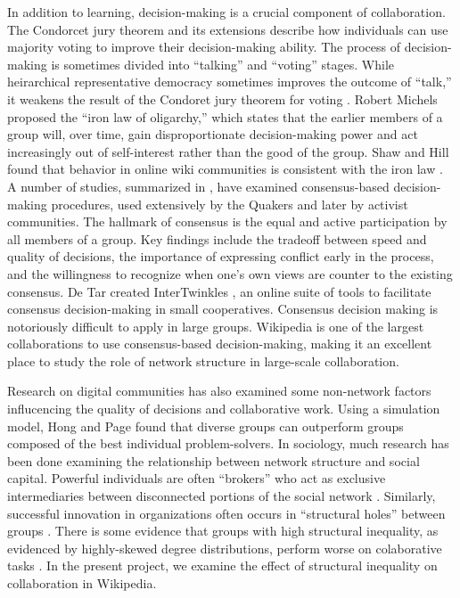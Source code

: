 \documentclass[10pt,twocolumn]{article}
\newcommand{\+}{\phantom{-}}
\begin{document}
In addition to learning, decision-making is a crucial component of collaboration.
The Condorcet jury theorem and its extensions \cite{list_epistemic_2001}
describe how individuals can use majority voting to improve their
decision-making ability.
The process of decision-making is sometimes divided into
``talking'' and ``voting'' stages.
While heirarchical representative democracy sometimes improves the outcome
of ``talk,'' it weakens the result of the Condoret jury theorem for voting
\cite{list_epistemic_2001}.
Robert Michels proposed the ``iron law of oligarchy,''
\cite{michels_political_1999} which states that
the earlier members of a group will, over time, gain disproportionate
decision-making power and act increasingly out of self-interest rather than
the good of the group.
Shaw and Hill found that behavior in online wiki communities is consistent
with the iron law \cite{shaw_laboratories_2014}.
A number of studies, summarized in \cite{gentry_consensus_1982},
have examined consensus-based decision-making procedures, used extensively by
the Quakers and later by activist communities.
The hallmark of consensus is the equal and active participation by all members
of a group.
Key findings include the tradeoff between speed and quality of decisions,
the importance of expressing conflict early in the process,
and the willingness to recognize when one's own views are counter to the
existing consensus.
De Tar created InterTwinkles \cite{detar_intertwinkles:_2013},
an online suite of tools to facilitate consensus decision-making
in small cooperatives.
Consensus decision making is notoriously difficult to apply in large groups.
Wikipedia is one of the largest collaborations to use consensus-based
decision-making,
making it an excellent place to study the role of network structure in
large-scale collaboration.

Research on digital communities has also examined some non-network factors
influcencing the quality of decisions and collaborative work.
Using a simulation model, Hong and Page \cite{hong_groups_2004} found that
diverse groups can outperform groups composed of the best individual
problem-solvers.
In sociology, much research has been done examining the relationship between
network structure and social capital.
Powerful individuals are often ``brokers''
who act as exclusive intermediaries between disconnected portions of the
social network \mbox{\cite{silverman_patronage_1965}}.
Similarly, successful innovation in organizations often occurs in ``structural
holes'' between groups \mbox{\cite{granovetter_strength_1973}}.
There is some evidence that groups with high structural inequality,
as evidenced by highly-skewed degree distributions,
perform worse on colaborative tasks \mbox{\cite{kearns_experiments_2012}}.
In the present project, we examine the effect of structural inequality
on collaboration in Wikipedia.
\end{document}
